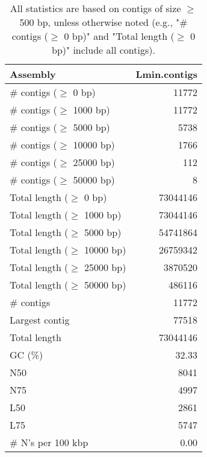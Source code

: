 \documentclass[12pt,a4paper]{article}
\begin{document}
\begin{table}[ht]
\begin{center}
\caption{All statistics are based on contigs of size $\geq$ 500 bp, unless otherwise noted (e.g., "\# contigs ($\geq$ 0 bp)" and "Total length ($\geq$ 0 bp)" include all contigs).}
\begin{tabular}{|l*{1}{|r}|}
\hline
Assembly & Lmin.contigs \\ \hline
\# contigs ($\geq$ 0 bp) & 11772 \\ \hline
\# contigs ($\geq$ 1000 bp) & 11772 \\ \hline
\# contigs ($\geq$ 5000 bp) & 5738 \\ \hline
\# contigs ($\geq$ 10000 bp) & 1766 \\ \hline
\# contigs ($\geq$ 25000 bp) & 112 \\ \hline
\# contigs ($\geq$ 50000 bp) & 8 \\ \hline
Total length ($\geq$ 0 bp) & 73044146 \\ \hline
Total length ($\geq$ 1000 bp) & 73044146 \\ \hline
Total length ($\geq$ 5000 bp) & 54741864 \\ \hline
Total length ($\geq$ 10000 bp) & 26759342 \\ \hline
Total length ($\geq$ 25000 bp) & 3870520 \\ \hline
Total length ($\geq$ 50000 bp) & 486116 \\ \hline
\# contigs & 11772 \\ \hline
Largest contig & 77518 \\ \hline
Total length & 73044146 \\ \hline
GC (\%) & 32.33 \\ \hline
N50 & 8041 \\ \hline
N75 & 4997 \\ \hline
L50 & 2861 \\ \hline
L75 & 5747 \\ \hline
\# N's per 100 kbp & 0.00 \\ \hline
\end{tabular}
\end{center}
\end{table}
\end{document}
